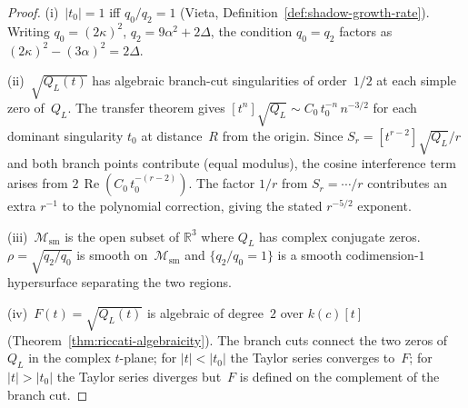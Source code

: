 \begin{proof}
(i)~$|t_0| = 1$ iff $q_0/q_2 = 1$
(Vieta, Definition~\ref{def:shadow-growth-rate}).
Writing $q_0 = (2\kappa)^2$,
$q_2 = 9\alpha^2 + 2\Delta$, the condition $q_0 = q_2$
factors as $(2\kappa)^2 - (3\alpha)^2 = 2\Delta$.

(ii)~$\sqrt{Q_L(t)}$ has algebraic branch-cut singularities
of order~$1/2$ at each simple zero of~$Q_L$.
The transfer theorem gives
$[t^n]\sqrt{Q_L} \sim C_0\,t_0^{-n}\,n^{-3/2}$
for each dominant singularity $t_0$ at distance~$R$
from the origin.
Since $S_r = [t^{r-2}]\sqrt{Q_L}/r$ and both branch
points contribute (equal modulus), the cosine interference
term arises from
$2\,\operatorname{Re}(C_0\,t_0^{-(r-2)})$.
The factor $1/r$ from $S_r = \dotsb/r$ contributes an
extra $r^{-1}$ to the polynomial correction, giving the
stated $r^{-5/2}$ exponent.

(iii)~$\mathcal{M}_{\mathrm{sm}}$ is the open subset of
$\mathbb{R}^3$ where $Q_L$ has complex conjugate zeros.
$\rho = \sqrt{q_2/q_0}$ is smooth on~$\mathcal{M}_{\mathrm{sm}}$
and $\{q_2/q_0 = 1\}$ is a smooth codimension-$1$
hypersurface separating the two regions.

(iv)~$F(t) = \sqrt{Q_L(t)}$ is algebraic of degree~$2$
over $k(c)[t]$
(Theorem~\ref{thm:riccati-algebraicity}).
The branch cuts connect the two zeros of~$Q_L$ in the
complex $t$-plane; for $|t| < |t_0|$ the Taylor series
converges to~$F$; for $|t| > |t_0|$ the Taylor series
diverges but~$F$ is defined on the complement of the
branch cut.
\end{proof}

